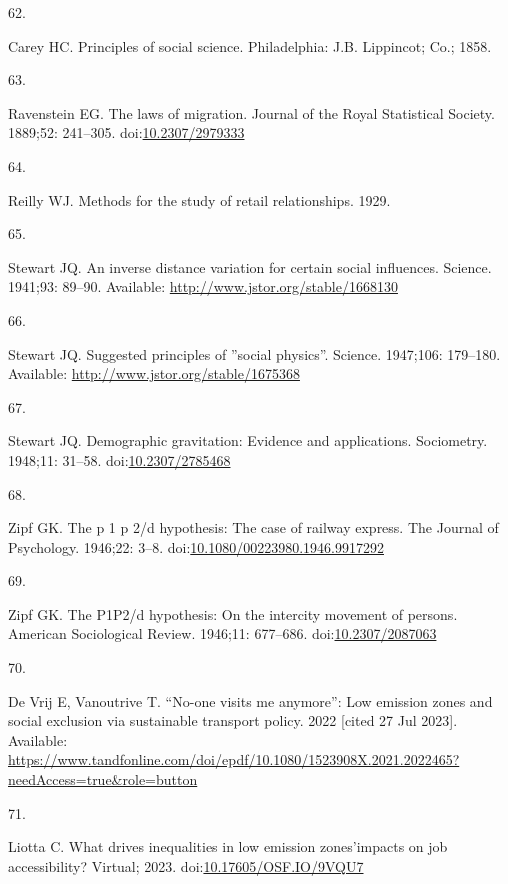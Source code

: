\documentclass[10pt,letterpaper]{article}
\newlength{\cslhangindent}
\newlength{\csllabelwidth}
\newlength{\cslentryspacingunit} %
\newenvironment{CSLReferences}[2] %
 {%
  \setlength{\parindent}{0pt}
  \ifodd #1
  \let\oldpar\par
  \def\par{\hangindent=\cslhangindent\oldpar}
  \fi
  \setlength{\parskip}{#2\cslentryspacingunit}
 }%
 {}
\newcommand{\CSLLeftMargin}[1]{\parbox[t]{\csllabelwidth}{#1}}
\newcommand{\CSLRightInline}[1]{\parbox[t]{\linewidth - \csllabelwidth}{#1}\break}
\begin{document}
\begin{CSLReferences}{0}{0}
\leavevmode{}%
\CSLLeftMargin{62. }%
\CSLRightInline{Carey HC. Principles of social science. Philadelphia:
J.B. Lippincot; Co.; 1858. }

\leavevmode{}%
\CSLLeftMargin{63. }%
\CSLRightInline{Ravenstein EG. The laws of migration. Journal of the
Royal Statistical Society. 1889;52: 241--305.
doi:\href{https://doi.org/10.2307/2979333}{10.2307/2979333}}

\leavevmode{}%
\CSLLeftMargin{64. }%
\CSLRightInline{Reilly WJ. Methods for the study of retail
relationships. 1929. }

\leavevmode{}%
\CSLLeftMargin{65. }%
\CSLRightInline{Stewart JQ. An inverse distance variation for certain
social influences. Science. 1941;93: 89--90. Available:
\url{http://www.jstor.org/stable/1668130}}

\leavevmode{}%
\CSLLeftMargin{66. }%
\CSLRightInline{Stewart JQ. Suggested principles of ''social physics''.
Science. 1947;106: 179--180. Available:
\url{http://www.jstor.org/stable/1675368}}

\leavevmode{}%
\CSLLeftMargin{67. }%
\CSLRightInline{Stewart JQ. Demographic gravitation: Evidence and
applications. Sociometry. 1948;11: 31--58.
doi:\href{https://doi.org/10.2307/2785468}{10.2307/2785468}}

\leavevmode{}%
\CSLLeftMargin{68. }%
\CSLRightInline{Zipf GK. The p 1 p 2/d hypothesis: The case of railway
express. The Journal of Psychology. 1946;22: 3--8.
doi:\href{https://doi.org/10.1080/00223980.1946.9917292}{10.1080/00223980.1946.9917292}}

\leavevmode{}%
\CSLLeftMargin{69. }%
\CSLRightInline{Zipf GK. The P1P2/d hypothesis: On the intercity
movement of persons. American Sociological Review. 1946;11: 677--686.
doi:\href{https://doi.org/10.2307/2087063}{10.2307/2087063}}

\leavevmode{}%
\CSLLeftMargin{70. }%
\CSLRightInline{De Vrij E, Vanoutrive T. {``No-one visits me anymore''}:
Low emission zones and social exclusion via sustainable transport
policy. 2022 {[}cited 27 Jul 2023{]}. Available:
\url{https://www.tandfonline.com/doi/epdf/10.1080/1523908X.2021.2022465?needAccess=true\&role=button}}

\leavevmode{}%
\CSLLeftMargin{71. }%
\CSLRightInline{Liotta C. What drives inequalities in low emission
zones'impacts on job accessibility? Virtual; 2023.
doi:\href{https://doi.org/10.17605/OSF.IO/9VQU7}{10.17605/OSF.IO/9VQU7}}

\end{CSLReferences}

\nolinenumbers
\end{document}
